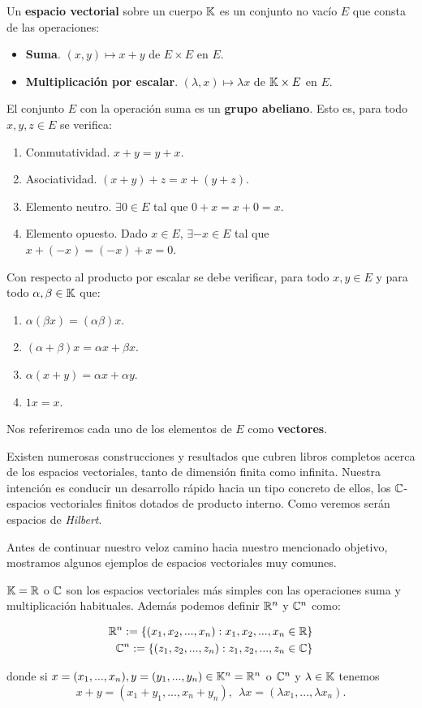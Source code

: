 \begin{definition} Un \textbf{espacio vectorial} sobre un cuerpo $\mathbb{K}$ es un conjunto no vacío $E$ que consta de las operaciones:
\begin{itemize}
\item \textbf{Suma}. $(x,y)\mapsto x+y$ de $E\times E$ en $E$.
\item \textbf{Multiplicación por escalar}. $(\lambda,x)\mapsto \lambda x$ de $\mathbb{K}\times E$ en $E$.
\end{itemize}
El conjunto $E$ con la operación suma es un \textbf{grupo abeliano}. Esto es, para todo $x,y,z\in E$ se verifica:
\begin{enumerate}[label=\alph*)]
\item Conmutatividad. $x + y = y + x$.
\item Asociatividad. $(x + y) + z = x + (y + z)$.
\item Elemento neutro. $\exists 0\in E$ tal que $0+x=x+0=x$.
\item Elemento opuesto. Dado $x\in E$, $\exists -x\in E$ tal que $x+(-x)=(-x)+x=0$.
\end{enumerate}
Con respecto al producto por escalar se debe verificar, para todo $x,y\in E$ y para todo $\alpha,\beta\in\mathbb{K}$ que:
\begin{enumerate}[label=\alph*)]
\item $\alpha(\beta x)=(\alpha\beta)x$.
\item $(\alpha + \beta)x=\alpha x +\beta x$.
\item $\alpha (x + y) =\alpha x +\alpha y$.
\item $1x = x$.
\end{enumerate}
Nos referiremos cada uno de los elementos de $E$ como \textbf{vectores}.
\end{definition}

Existen numerosas construcciones y resultados que cubren libros completos acerca de los espacios vectoriales, tanto de dimensión finita como infinita. Nuestra intención es conducir un desarrollo rápido hacia un tipo concreto de ellos, los $\mathbb{C}$-espacios vectoriales finitos dotados de producto interno. Como veremos serán espacios de \textit{Hilbert}.

Antes de continuar nuestro veloz camino hacia nuestro mencionado objetivo, mostramos algunos ejemplos de espacios vectoriales muy comunes.

\begin{example} $\mathbb{K}=\mathbb{R}$ o $\mathbb{C}$ son los espacios vectoriales más simples con las operaciones suma y multiplicación habituales. Además podemos definir $\mathbb{R}^n$ y $\mathbb{C}^n$ como:

\begin{equation}
\begin{split}
\mathbb{R}^n:=\{(x_1,x_2,...,x_n): x_1,x_2,...,x_n\in\mathbb{R}\} \\
\mathbb{C}^n:=\{(z_1,z_2,...,z_n): z_1,z_2,...,z_n\in\mathbb{C}\}
\end{split}
\end{equation}

donde si $x=(x_1,...,x_n),y=(y_1,...,y_n)\in\mathbb{K}^n=\mathbb{R}^n$ o $\mathbb{C}^n$ y $\lambda\in\mathbb{K}$ tenemos
\[x+y=(x_1+y_1,...,x_n+y_n),\ \ \lambda x=(\lambda x_1,...,\lambda x_n).\]
\end{example}

